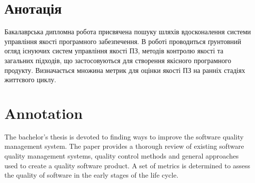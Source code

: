 \frontmatter
\chapter*{Анотація}%

Бакалаврська дипломна робота присвячена пошуку шляхів вдосконалення системи управління якості програмного забезпечення. В роботі проводиться ґрунтовний огляд існуючих систем управління якості ПЗ, методів контролю якості та загальних підходів, що застосовуються для створення якісного програмного продукту. Визначається множина метрик для оцінки якості ПЗ на ранніх стадіях життєвого циклу.

\vspace{6ex}

{\let\clearpage\relax\chapter*{Annotation}}

The bachelor's thesis is devoted to finding ways to improve the software quality management system. The paper provides a thorough review of existing software quality management systems, quality control methods and general approaches used to create a quality software product. A set of metrics is determined to assess the quality of software in the early stages of the life cycle.

\mainmatter
\newpage